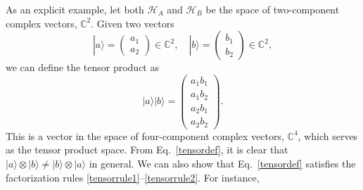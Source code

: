 \documentclass[pra,12pt]{revtex4-2}
\begin{document}
As an explicit example, let both $\mathscr{H}_A$ and $\mathscr{H}_B$
be the space of two-component complex vectors, $\mathbb{C}^2$.  Given
two vectors
\begin{equation}
  |a\rangle = \begin{pmatrix} a_1 \\ a_2 \end{pmatrix} \in \mathbb{C}^2,
  \quad
  |b\rangle = \begin{pmatrix} b_1 \\ b_2 \end{pmatrix} \in \mathbb{C}^2,
\end{equation}
we can define the tensor product as
\begin{equation}
  |a\rangle |b\rangle =
  \begin{pmatrix} a_1 b_1 \\ a_1 b_2 \\ a_2 b_1 \\ a_2 b_2 \end{pmatrix}.
  \label{tensordef}
\end{equation}
This is a vector in the space of four-component complex vectors,
$\mathbb{C}^4$, which serves as the tensor product space.  From
Eq.~\eqref{tensordef}, it is clear that $|a\rangle \otimes |b\rangle
\ne |b\rangle \otimes |a\rangle$ in general.  We can also show that
Eq.~\eqref{tensordef} satisfies the factorization rules
\eqref{tensorrule1}--\eqref{tensorrule2}.  For instance,
\end{document}
